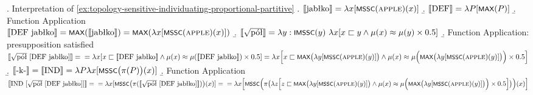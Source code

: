 	\ex. Interpretation of \ref{ex:topology-sensitive-individuating-proportional-partitive}\label{ex:topology-sensitive-individuating-proportional-partitive-interpretation}
	\a. $\llbracket \text{jabłko}\rrbracket = \lambda x [\cnst{mssc}(\textsc{apple})(x)]$\label{ex:topology-sensitive-individuating-proportional-partitive-interpretation-a}
	\b. $\llbracket \text{DEF}\rrbracket = \lambda P [\cnst{max}(P)]$\label{ex:topology-sensitive-individuating-proportional-partitive-interpretation-b}
	\b. Function Application\\
	$\llbracket \text{DEF jabłko}\rrbracket = \cnst{max}(\llbracket \text{jabłko}\rrbracket) = \cnst{max}(\lambda x [\cnst{mssc}(\textsc{apple})(x)])$\label{ex:topology-sensitive-individuating-proportional-partitive-interpretation-c}
	\b. $\llbracket \sqrt{\text{pół}}\rrbracket = \lambda y : \cnst{imssc}(y)\ \lambda x [x \sqsubset y \wedge \mu(x) \approx \mu(y) \times 0.5]$\label{ex:topology-sensitive-individuating-proportional-partitive-interpretation-d}
	\b. Function Application: presupposition satisfied\\
	$\llbracket \text{$\sqrt{\text{pół}}$ [DEF jabłko]}\rrbracket = \\
    = \lambda x [x \sqsubset \llbracket \text{DEF jabłko}\rrbracket \wedge \mu(x) \approx \mu(\llbracket \text{DEF jabłko}\rrbracket) \times 0.5] = \\
	\lambda x \Big[x \sqsubset \cnst{max}\big(\lambda y [\cnst{mssc}(\textsc{apple})(y)]\big) \\
	\wedge \mu(x) \approx \mu\Big(\cnst{max}\big(\lambda y [\cnst{mssc}(\textsc{apple})(y)]\big)\Big) \times 0.5\Big]$\label{ex:topology-sensitive-individuating-proportional-partitive-interpretation-e}
	\b. $\llbracket \text{-k-}\rrbracket = \llbracket \text{IND}\rrbracket = \lambda P \lambda x[\cnst{mssc}\big(\pi(P)\big)(x)]$\label{ex:topology-sensitive-individuating-proportional-partitive-interpretation-f}
	\b. Function Application\\
	$\llbracket \text{IND [$\sqrt{\text{pół}}$ [DEF jabłko]]}\rrbracket = \\
    = \lambda x[\cnst{mssc}\big(\pi(\llbracket \text{$\sqrt{\text{pół}}$ [DEF jabłko]}\rrbracket)\big)(x)] = \\
	= \lambda x\Big[\cnst{mssc}\Big(\pi\big(\lambda z \Big[z \sqsubset \cnst{max}\big(\lambda y [\cnst{mssc}(\textsc{apple})(y)]\big) \\
	\wedge \mu(x) \approx \mu\Big(\cnst{max}\big(\lambda y [\cnst{mssc}(\textsc{apple})(y)]\big)\Big) \times 0.5\Big]\big)\Big)(x)\Big]$\label{ex:topology-sensitive-individuating-proportional-partitive-interpretation-g}

